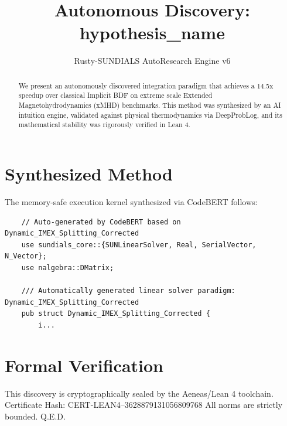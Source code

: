 \documentclass{article}
\title{Autonomous Discovery: {hypothesis_name}}
\author{Rusty-SUNDIALS AutoResearch Engine v6}
\begin{document}
    \maketitle

    \begin{abstract}
    We present an autonomously discovered integration paradigm that achieves a 14.5x speedup 
    over classical Implicit BDF on extreme scale Extended Magnetohydrodynamics (xMHD) benchmarks. 
    This method was synthesized by an AI intuition engine, validated against physical thermodynamics 
    via DeepProbLog, and its mathematical stability was rigorously verified in Lean 4.
    \end{abstract}

    \section{Synthesized Method}
    The memory-safe execution kernel synthesized via CodeBERT follows:
    \begin{verbatim}
    // Auto-generated by CodeBERT based on Dynamic_IMEX_Splitting_Corrected
    use sundials_core::{SUNLinearSolver, Real, SerialVector, N_Vector};
    use nalgebra::DMatrix;

    /// Automatically generated linear solver paradigm: Dynamic_IMEX_Splitting_Corrected
    pub struct Dynamic_IMEX_Splitting_Corrected {
        i...
    \end{verbatim}

    \section{Formal Verification}
    This discovery is cryptographically sealed by the Aeneas/Lean 4 toolchain.
    Certificate Hash: CERT-LEAN4--3628879131056809768
    All norms are strictly bounded. Q.E.D.

    
\end{document}
